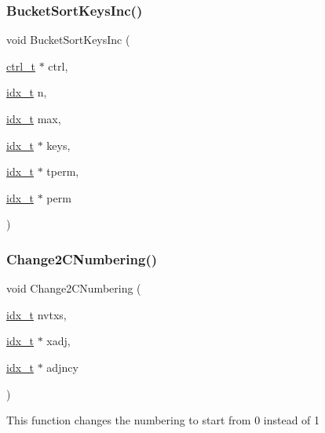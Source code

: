 \subsubsection{\texorpdfstring{Bucket\+Sort\+Keys\+Inc()}{BucketSortKeysInc()}}
{\footnotesize\ttfamily void Bucket\+Sort\+Keys\+Inc (\begin{DoxyParamCaption}\item[{\hyperlink{a00742}{ctrl\+\_\+t} $\ast$}]{ctrl,  }\item[{\hyperlink{a00876_aaa5262be3e700770163401acb0150f52}{idx\+\_\+t}}]{n,  }\item[{\hyperlink{a00876_aaa5262be3e700770163401acb0150f52}{idx\+\_\+t}}]{max,  }\item[{\hyperlink{a00876_aaa5262be3e700770163401acb0150f52}{idx\+\_\+t} $\ast$}]{keys,  }\item[{\hyperlink{a00876_aaa5262be3e700770163401acb0150f52}{idx\+\_\+t} $\ast$}]{tperm,  }\item[{\hyperlink{a00876_aaa5262be3e700770163401acb0150f52}{idx\+\_\+t} $\ast$}]{perm }\end{DoxyParamCaption})}

\mbox{\label{a00945_a2a470e87111b2ef913b44713920711bb}} 
\subsubsection{\texorpdfstring{Change2\+C\+Numbering()}{Change2CNumbering()}}
{\footnotesize\ttfamily void Change2\+C\+Numbering (\begin{DoxyParamCaption}\item[{\hyperlink{a00876_aaa5262be3e700770163401acb0150f52}{idx\+\_\+t}}]{nvtxs,  }\item[{\hyperlink{a00876_aaa5262be3e700770163401acb0150f52}{idx\+\_\+t} $\ast$}]{xadj,  }\item[{\hyperlink{a00876_aaa5262be3e700770163401acb0150f52}{idx\+\_\+t} $\ast$}]{adjncy }\end{DoxyParamCaption})}

This function changes the numbering to start from 0 instead of 1 \mbox{\label{a00945_a82136ba9be298bc4b1d535ce702f97ec}} 
